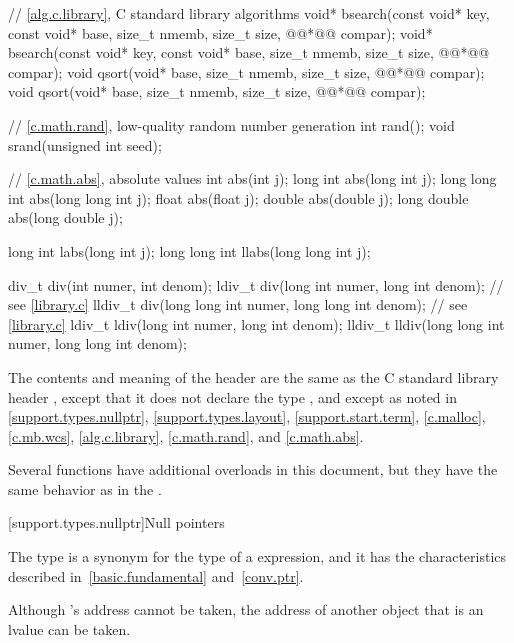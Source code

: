 \begin{codeblock}
{  // \ref{alg.c.library}, C standard library algorithms
  void* bsearch(const void* key, const void* base, size_t nmemb, size_t size,
                @@*@\itcorr[-1]@ compar);
  void* bsearch(const void* key, const void* base, size_t nmemb, size_t size,
                @@*@\itcorr[-1]@ compar);
  void qsort(void* base, size_t nmemb, size_t size, @@*@\itcorr[-1]@ compar);
  void qsort(void* base, size_t nmemb, size_t size, @@*@\itcorr[-1]@ compar);

  // \ref{c.math.rand}, low-quality random number generation
  int rand();
  void srand(unsigned int seed);

  // \ref{c.math.abs}, absolute values
  int abs(int j);
  long int abs(long int j);
  long long int abs(long long int j);
  float abs(float j);
  double abs(double j);
  long double abs(long double j);

  long int labs(long int j);
  long long int llabs(long long int j);

  div_t div(int numer, int denom);
  ldiv_t div(long int numer, long int denom);             // see \ref{library.c}
  lldiv_t div(long long int numer, long long int denom);  // see \ref{library.c}
  ldiv_t ldiv(long int numer, long int denom);
  lldiv_t lldiv(long long int numer, long long int denom);
}
\end{codeblock}

\pnum
The contents and meaning of the header  are the same as
the C standard library header ,
except that it does not declare the type ,
and except as noted in
\ref{support.types.nullptr},
\ref{support.types.layout},
\ref{support.start.term},
\ref{c.malloc},
\ref{c.mb.wcs},
\ref{alg.c.library},
\ref{c.math.rand}, and
\ref{c.math.abs}.
\begin{note}
Several functions have additional overloads in this document,
but they have the same behavior as in the .
\end{note}


[support.types.nullptr]{Null pointers}

\pnum
The type  is a synonym
for the type of a  expression, and it
has the characteristics
described in~\ref{basic.fundamental} and~\ref{conv.ptr}.
\begin{note}
Although 's address cannot be taken, the address of another
 object that is an lvalue can be taken.
\end{note}

